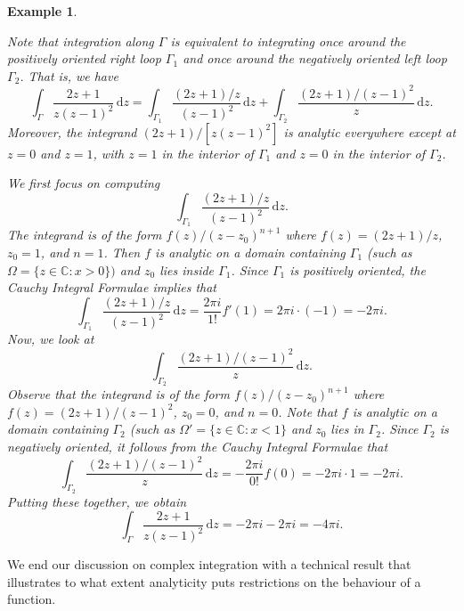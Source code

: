 \documentclass[10pt]{article}
\newcommand{\C}{\mathbb{C}}
\newcommand{\dd}{\,\mathrm{d}}
\theoremstyle{newstyle}
\newtheorem{exmp}[thm]{Example}
\begin{document}
\begin{exmp}
\begin{center}
\end{center}
Note that integration along $\Gamma$ is equivalent to integrating once around the 
positively oriented right loop $\Gamma_1$ and once around the negatively oriented left loop 
$\Gamma_2$. That is, we have 
\[ \int_\Gamma \frac{2z+1}{z(z-1)^2}\dd z = \int_{\Gamma_1} \frac{(2z+1)/z}{(z-1)^2}\dd z 
+ \int_{\Gamma_2} \frac{(2z+1)/(z-1)^2}{z}\dd z. \]
Moreover, the integrand $(2z+1)/[z(z-1)^2]$ is analytic everywhere except at $z = 0$ and 
$z = 1$, with $z = 1$ in the interior of $\Gamma_1$ and $z = 0$ in the interior of $\Gamma_2$. 

We first focus on computing 
\[ \int_{\Gamma_1} \frac{(2z+1)/z}{(z-1)^2}\dd z. \]
The integrand is of the form $f(z)/(z-z_0)^{n+1}$ where $f(z) = (2z+1)/z$, $z_0 = 1$, and 
$n = 1$. Then $f$ is analytic on a domain containing $\Gamma_1$ (such as 
$\Omega = \{z \in \C : x > 0\})$ and $z_0$ lies inside $\Gamma_1$. Since $\Gamma_1$ is 
positively oriented, the Cauchy Integral Formulae implies that 
\[ \int_{\Gamma_1} \frac{(2z+1)/z}{(z-1)^2}\dd z = \frac{2\pi i}{1!} f'(1) = 
2\pi i \cdot (-1) = -2\pi i. \]
Now, we look at 
\[ \int_{\Gamma_2} \frac{(2z+1)/(z-1)^2}{z}\dd z. \]
Observe that the integrand is of the form $f(z)/(z-z_0)^{n+1}$ where 
$f(z) = (2z+1)/(z-1)^2$, $z_0 = 0$, and $n = 0$. Note that $f$ is analytic on a domain 
containing $\Gamma_2$ (such as $\Omega' = \{z \in \C : x < 1\}$ and $z_0$ lies in $\Gamma_2$. 
Since $\Gamma_2$ is negatively oriented, it follows from the Cauchy Integral Formulae that 
\[ \int_{\Gamma_2} \frac{(2z+1)/(z-1)^2}{z}\dd z = - \frac{2\pi i}{0!} f(0) = 
-2\pi i \cdot 1 = -2\pi i. \]
Putting these together, we obtain 
\[ \int_\Gamma \frac{2z+1}{z(z-1)^2}\dd z = -2\pi i - 2\pi i = -4\pi i. \]
\end{exmp}

We end our discussion on complex integration with a technical result that illustrates to 
what extent analyticity puts restrictions on the behaviour of a function.
\end{document}
